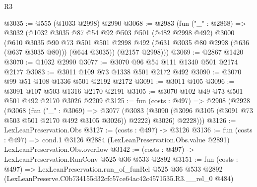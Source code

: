 \begin{lexlean}{R3}
\begin{coremodule}
@3035 := @555 (@1033 @2998) @2990
@3068 := @2983
    (fun ("_" : @2868) =>
    @3032
      (@1032
        @3035
        @87
        @54
        @92
        @503
        @501
        (@482 @2998 @492)
        @3000
        (@610
          @3035
          @90
          @73
          @501
          @501
          @2998
          @492
          (@631 @3035 @80 @2998 (@636 (@637 @3035 @80)))
          (@644 @3035))
        (@2157 @2998)))
@3069 := @2867 @1420
@3070 := @1032 @2990
@3077 := @3070 @96 @54 @111 @1340 @501 @2174 @2177
@3083 := @3011 @109 @73 @1338 @501 @2172 @492
@3090 := @3070 @99 @51 @108 @1336 @501 @2192 @2172
@3091 := @3011 @105
@3096 := @3091 @107 @503 @1316 @2170 @2191
@3105 := @3070 @102 @49 @73 @501 @501 @492 @2170 @3026 @2209
@3125 := fun (costs : @497) =>
  @2908
    (@2928
      (@3068
        (fun ("_" : @3069) =>
        @3077
          (@3083 (@3090 (@3096 @3105 (@3091 @73 @503 @501 @2170 @492 @3105 @3026)) @2222) @3026)
          @2228)))
@3126 := LexLeanPreservation.Obs
@3127 := (costs : @497) -> @3126
@3136 := fun (costs : @497) =>
  cond.{1} @3126 @2884 (LexLeanPreservation.Obs.value @2891) LexLeanPreservation.Obs.overflow
@3142 := (costs : @497) -> LexLeanPreservation.RunConv @525 @36 @533 @2892
@3151 := fun (costs : @497) =>
  LexLeanPreservation.run_of_funRel
    @525
    @36
    @533
    @2892
    (LexLeanPreserve.C0b734155d32cfc57ce64ac42c4571535.R3.__rel_0 @484)
\end{coremodule}
\end{lexlean}
